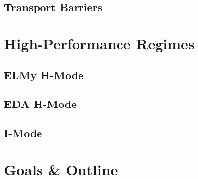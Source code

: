 \subsection{Transport Barriers}\label{subsec:intro_barriers}


\section{High-Performance Regimes}\label{sec:intro_regimes}

\subsection{ELMy H-Mode}\label{subsec:intro_elmy}

\subsection{EDA H-Mode}\label{subsec:intro_EDA}

\subsection{I-Mode}\label{subsec:intro_imode}


\section{Goals \& Outline}\label{sec:intro_outline}



%
% 